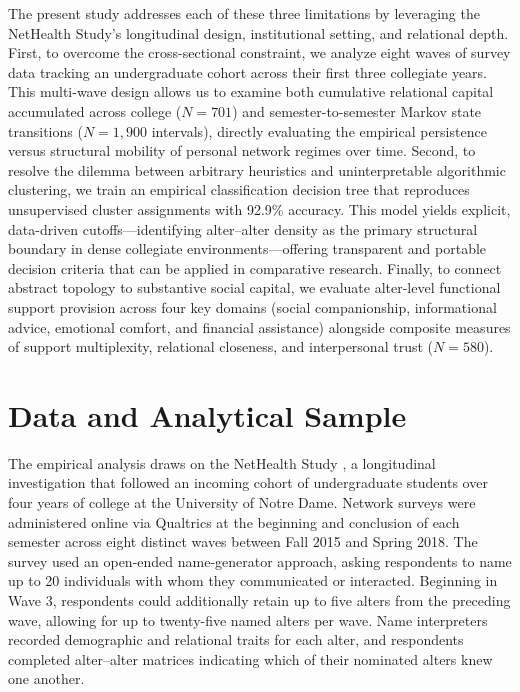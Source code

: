 \documentclass[12pt]{article}
\begin{document}
The present study addresses each of these three limitations by leveraging the NetHealth Study's longitudinal design, institutional setting, and relational depth. First, to overcome the cross-sectional constraint, we analyze eight waves of survey data tracking an undergraduate cohort across their first three collegiate years. This multi-wave design allows us to examine both cumulative relational capital accumulated across college ($N = 701$) and semester-to-semester Markov state transitions ($N = 1{,}900$ intervals), directly evaluating the empirical persistence versus structural mobility of personal network regimes over time. Second, to resolve the dilemma between arbitrary heuristics and uninterpretable algorithmic clustering, we train an empirical classification decision tree that reproduces unsupervised cluster assignments with 92.9\% accuracy. This model yields explicit, data-driven cutoffs---identifying alter--alter density as the primary structural boundary in dense collegiate environments---offering transparent and portable decision criteria that can be applied in comparative research. Finally, to connect abstract topology to substantive social capital, we evaluate alter-level functional support provision across four key domains (social companionship, informational advice, emotional comfort, and financial assistance) alongside composite measures of support multiplexity, relational closeness, and interpersonal trust ($N = 580$).

\section{Data and Analytical Sample}

The empirical analysis draws on the NetHealth Study \citep{liu2018network, sepulvado2020predicting, wang2020neither}, a longitudinal investigation that followed an incoming cohort of undergraduate students over four years of college at the University of Notre Dame. Network surveys were administered online via Qualtrics at the beginning and conclusion of each semester across eight distinct waves between Fall 2015 and Spring 2018. The survey used an open-ended name-generator approach, asking respondents to name up to 20 individuals with whom they communicated or interacted. Beginning in Wave 3, respondents could additionally retain up to five alters from the preceding wave, allowing for up to twenty-five named alters per wave. Name interpreters recorded demographic and relational traits for each alter, and respondents completed alter--alter matrices indicating which of their nominated alters knew one another.
\end{document}
